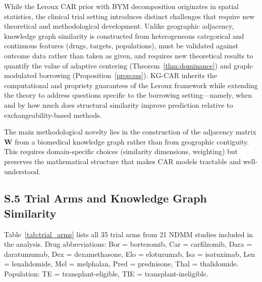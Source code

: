 \documentclass[12pt]{article}
\newcommand{\bW}{\mathbf{W}}
\begin{document}
While the Leroux CAR prior with BYM decomposition originates in spatial statistics, the clinical trial setting introduces distinct challenges that require new theoretical and methodological development. Unlike geographic adjacency, knowledge graph similarity is constructed from heterogeneous categorical and continuous features (drugs, targets, populations), must be validated against outcome data rather than taken as given, and requires new theoretical results to quantify the value of adaptive centering (Theorem~\ref{thm:dominance}) and graph-modulated borrowing (Proposition~\ref{prop:ess}). KG-CAR inherits the computational and propriety guarantees of the Leroux framework \citep{rue2009approximate} while extending the theory to address questions specific to the borrowing setting---namely, when and by how much does structural similarity improve prediction relative to exchangeability-based methods.

The main methodological novelty lies in the construction of the adjacency matrix $\bW$ from a biomedical knowledge graph rather than from geographic contiguity. This requires domain-specific choices (similarity dimensions, weighting) but preserves the mathematical structure that makes CAR models tractable and well-understood.

\subsection*{S.5 Trial Arms and Knowledge Graph Similarity}
\label{sec:supp_trials}

Table~\ref{tab:trial_arms} lists all 35 trial arms from 21 NDMM studies included in the analysis. Drug abbreviations: Bor = bortezomib, Car = carfilzomib, Dara = daratumumab, Dex = dexamethasone, Elo = elotuzumab, Isa = isatuximab, Len = lenalidomide, Mel = melphalan, Pred = prednisone, Thal = thalidomide. Population: TE = transplant-eligible, TIE = transplant-ineligible.
\end{document}
